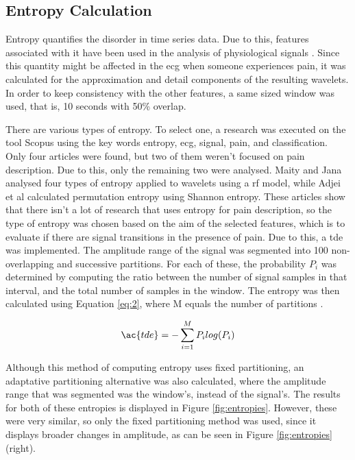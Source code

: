 \subsection{Entropy Calculation}
Entropy quantifies the disorder in time series data. Due to this, features associated with it have been used in the analysis of physiological signals \cite{Koh2022}. Since this quantity might be affected in the \ac{ecg} when someone experiences pain, it was calculated for the approximation and detail components of the resulting wavelets. In order to keep consistency with the other features, a same sized window was used, that is, 10 seconds with 50\% overlap. %

There are various types of entropy. To select one, a research was executed on the tool Scopus using the key words entropy, ecg, signal, pain, and classification. Only four articles were found, but two of them weren't focused on pain description. Due to this, only the remaining two were analysed. Maity and Jana \cite{Maity2023} analysed four types of entropy applied to wavelets using a \ac{rf} model, while Adjei et al \cite{Adjei2017} calculated permutation entropy using Shannon entropy. These articles show that there isn't a lot of research that uses entropy for pain description, so the type of entropy was chosen based on the aim of the selected features, which is to evaluate if there are signal transitions in the presence of pain. Due to this, a \ac{tde} was implemented. The amplitude range of the signal was segmented into 100 non-overlapping and successive partitions. For each of these, the probability $P_i$ was determined by computing the ratio between the number of signal samples in that interval, and the total number of samples in the window. The entropy was then calculated using Equation \ref{eq:2}, where M equals the number of partitions \cite{Ferreira2017}. 

\begin{equation} \label{eq:2}
\ac{tde}=-\sum_{i=1}^{M}P_ilog(P_i)
\end{equation}

Although this method of computing entropy uses fixed partitioning, an adaptative partitioning alternative was also calculated, where the amplitude range that was segmented was the window's, instead of the signal's. The results for both of these entropies is displayed in Figure \ref{fig:entropies}. However, these were very similar, so only the fixed partitioning method was used, since it displays broader changes in amplitude, as can be seen in Figure \ref{fig:entropies} (right). 

